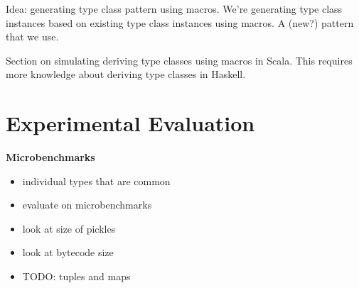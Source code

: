 \documentclass[preprint,10pt]{sigplanconf}
\begin{document}
Idea: generating type class pattern using macros. We're generating type class instances based on existing type class instances using macros. A (new?) pattern that we use.

Section on simulating deriving type classes using macros in Scala. This requires more knowledge about deriving type classes in Haskell.

\section{Experimental Evaluation}

{\bf Microbenchmarks}

\begin{itemize}
\item individual types that are common
\item evaluate on microbenchmarks
\item look at size of pickles
\item look at bytecode size
\item TODO: tuples and maps
\end{itemize}
\end{document}
